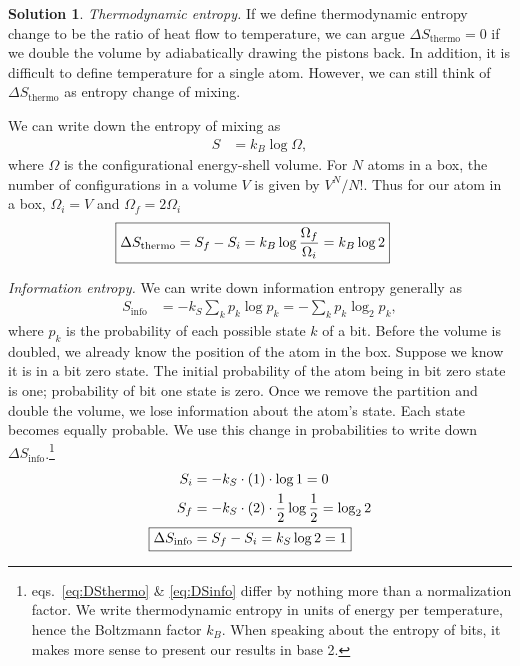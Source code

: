 \documentclass[11pt]{article}
\theoremstyle{definition}
\newtheorem*{solution}{Solution}
\numberwithin{equation}{section}
\numberwithin{figure}{section}
\begin{document}
\begin{solution}
\textit{Thermodynamic entropy.} If we define thermodynamic entropy change to be the ratio of heat flow to temperature, we can argue $\Delta S_\text{thermo} = 0$ if we double the volume by adiabatically drawing the pistons back. In addition, it is difficult to define temperature for a single atom. However, we can still think of $\Delta S_\text{thermo}$ as entropy change of mixing.

We can write down the entropy of mixing as
\begin{align}
S& = k_B \log \Omega \label{eq:S},
\end{align}
where $\Omega$ is the configurational energy-shell volume. For $N$ atoms in a box, the number of configurations in a volume $V$ is given by $V^N/N!$. Thus for our atom in a box, $\Omega_i = V$ and $\Omega_f = 2\Omega_i$
\begin{align}
\Aboxed{\Delta S_\text{thermo} & = S_f - S_i = k_B \log \frac{\Omega_f}{\Omega_i} = k_B \log 2} \label{eq:DSthermo}
\end{align}

\textit{Information entropy.} We can write down information entropy generally as
\begin{align}
S_\text{info} & = - k_S \sum_k p_k \log p_k = - \sum_k p_k \log_2 p_k\label{eq:Sinfo},
\end{align}
where $p_k$ is the probability of each possible state $k$ of a bit. Before the volume is doubled, we already know the position of the atom in the box. Suppose we know it is in a bit zero state. The initial probability of the atom being in bit zero state is one; probability of bit one state is zero. Once we remove the partition and double the volume, we lose information about the atom's state. Each state becomes equally probable. We use this change in probabilities to write down $\Delta S_\text{info}$.\footnote{eqs.~\eqref{eq:DSthermo} \& \eqref{eq:DSinfo} differ by nothing more than a normalization factor. We write thermodynamic entropy in units of energy per temperature, hence the Boltzmann factor $k_B$. When speaking about the entropy of bits, it makes more sense to present our results in base 2.}
\begin{align}
S_i &= -k_S \cdot(1) \cdot \log 1 = 0
\\
S_f &= -k_S \cdot(2) \cdot \frac{1}{2} \log \frac{1}{2} = \log_2{2}
\\
\Aboxed{
\Delta S_\text{info}  &= S_f - S_i = k_S \log{2} = 1}\label{eq:DSinfo}
\end{align}
\end{solution}
\end{document}
